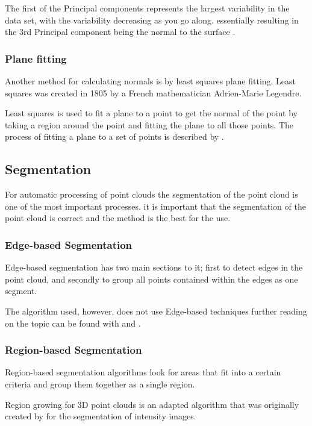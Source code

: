 			The first of the Principal components represents the largest variability in the data set, with the variability decreasing as you go along. essentially resulting in the 3rd Principal component being the normal to the surface \citep{dunteman_principal_1989}. 
		
		\subsubsection{Plane fitting}
			Another method for calculating normals is by least squares plane fitting. Least squares was created in 1805 by a French mathematician Adrien-Marie Legendre.
			
			Least squares is used to fit a plane to a point to get the normal of the point by taking a region around the point and fitting the plane to all those points. The process of fitting a plane to a set of points is described by \cite{schomaker_fit_1959}.
		
	
		
	\subsection{Segmentation}
		For automatic processing of point clouds the segmentation of the point cloud is one of the most important processes. it is important that the segmentation of the point cloud is correct and the method is the best for the use.
	
		\subsubsection{Edge-based Segmentation}
			Edge-based segmentation has two main sections to it; first to detect edges in the point cloud, and secondly to group all points contained within the edges as one segment.
			
			The algorithm used, however, does not use Edge-based techniques further reading on the topic can be found with \cite{sappa_fast_2001} and \cite{bhanu_automatic_1986}.
			
			
		\subsubsection{Region-based Segmentation}
			Region-based segmentation algorithms look for areas that fit into a certain criteria and group them together as a single region.
			
			Region growing for 3D point clouds is an adapted algorithm that was originally created by \cite{adams_seeded_1994} for the segmentation of intensity images.
			
